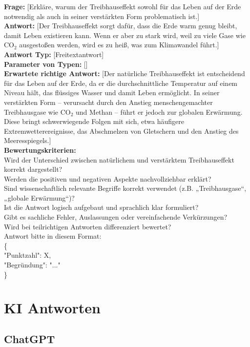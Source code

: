 \documentclass[a4paper,12pt]{article}
\begin{document}
\textbf{Frage:} [Erkläre, warum der Treibhauseffekt sowohl für das Leben auf der Erde notwendig als auch in seiner verstärkten Form problematisch ist.] \\
\textbf{Antwort:} [Der Treibhauseffekt sorgt dafür, dass die Erde warm genug bleibt, damit Leben existieren kann. Wenn er aber zu stark wird, weil zu viele Gase wie CO$_2$ ausgestoßen werden, wird es zu heiß, was zum Klimawandel führt.] \\
\textbf{Antwort Typ:} [Freitextantwort] \\
\textbf{Parameter von Typen:} [] \\
\textbf{Erwartete richtige Antwort:} [Der natürliche Treibhauseffekt ist entscheidend für das Leben auf der Erde, da er die durchschnittliche Temperatur auf einem Niveau hält, das flüssiges Wasser und damit Leben ermöglicht. In seiner verstärkten Form – verursacht durch den Anstieg menschengemachter Treibhausgase wie CO$_2$ und Methan – führt er jedoch zur globalen Erwärmung. Diese bringt schwerwiegende Folgen mit sich, etwa häufigere Extremwetterereignisse, das Abschmelzen von Gletschern und den Anstieg des Meeresspiegels.] \\
\textbf{Bewertungskriterien:} \\
Wird der Unterschied zwischen natürlichem und verstärktem Treibhauseffekt korrekt dargestellt? \\
Werden die positiven und negativen Aspekte nachvollziehbar erklärt? \\
Sind wissenschaftlich relevante Begriffe korrekt verwendet (z.B. „Treibhausgase“, „globale Erwärmung“)? \\
Ist die Antwort logisch aufgebaut und sprachlich klar formuliert? \\
Gibt es sachliche Fehler, Auslassungen oder vereinfachende Verkürzungen? \\
Wird bei teilrichtigen Antworten differenziert bewertet? \\
Antwort bitte in diesem Format: \\
\{ \\
"Punktzahl": X, \\
"Begründung": "..." \\
\}

\section{KI Antworten}

\subsection{ChatGPT}
\end{document}

